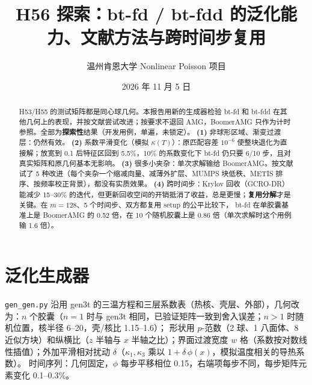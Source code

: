 \documentclass[11pt,a4paper]{ctexart}
\title{H56 探索：bt-fd / bt-fdd 的泛化能力、文献方法与跨时间步复用}
\author{温州肯恩大学 \quad Nonlinear Poisson 项目}
\date{2026 年 11 月 5 日}
\begin{document}
\maketitle
\begin{center}\end{center}

\begin{abstract}
\sloppy
H53/H55 的测试矩阵都是同心球几何。本报告用新的生成器检验 bt-fd 和 bt-fdd 在其他几何上的表现，并按文献尝试改进；按要求不退回 AMG，BoomerAMG 只作为计时参照。全部为\textbf{探索性}结果（开发用例，单遍，未锁定）。
\textbf{(1)} 非球形区域、渐变过渡层：仍然有效。
\textbf{(2)} 系数平滑变化（模拟 $\kappa(T)$）：原匹配容差 $10^{-6}$ 使整块退化为直接解；放宽到 0.1 后特征区回到 5.5\%，10\% 的系数变化下 bt-fd 仍只要 6/10 步，且对真实矩阵和原几何基本无影响。
\textbf{(3)} 很多小夹杂：单次求解输给 BoomerAMG。按文献试了 5 种改进（每个夹杂一个缩减向量、减薄外扩层、MUMPS 块低秩、METIS 排序、按频率校正背景），都没有实质效果。
\textbf{(4)} 跨时间步：Krylov 回收（GCRO-DR）能减少 15--30\% 的迭代，但更新回收空间的开销抵消了收益，总是更慢；\textbf{复用分解}才是关键。在 $m=128$、5 个时间步、双方都复用 setup 的公平比较下，
bt-fd 在单胶囊基准上是 BoomerAMG 的 0.52 倍，在 10 个随机胶囊上是 0.86 倍（单次求解时这个用例输 1.6 倍）。
\end{abstract}

\section{泛化生成器}
\sloppy \texttt{gen\_gen.py} 沿用 gen3t 的三温方程和三层系数表（热核、壳层、外部），几何改为：$n$ 个胶囊（$n=1$ 时与 gen3t 相同，已验证矩阵一致到舍入误差；$n>1$ 时随机位置，核半径 6--20，壳/核比 1.15--1.6）；
形状用 $p$-范数（2 球、1 八面体、8 近似方块）和纵横比（$z$ 半轴与 $x$ 半轴之比）；界面过渡宽度 $w$ 格（系数按对数线性插值）；外加平滑相对扰动 $\delta$（$\kappa_1,\kappa_3$ 乘以 $1+\delta\,\phi(x)$，模拟温度相关的导热系数）。
时间序列：几何固定，$\phi$ 每步平移相位 0.15，右端项每步不同，每步矩阵元素变化 0.1--0.3\%。
\end{document}
